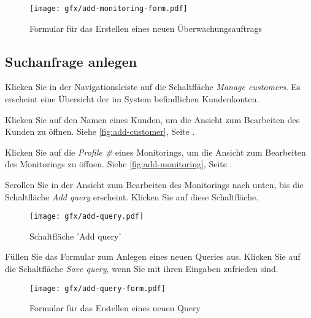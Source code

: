 \begin{figure}[H]
  \texttt{[image: gfx/add-monitoring-form.pdf]}
  \caption{Formular für das Erstellen eines neuen Überwachungsauftrags}
  \label{fig:add-monitoring-form}
\end{figure}

\subsection{Suchanfrage anlegen}

Klicken Sie in der Navigationsleiste auf die Schaltfläche \textit{Manage
customers}. Es erscheint eine Übersicht der im System befindlichen Kundenkonten.

Klicken Sie auf den Namen eines Kunden, um die Ansicht zum Bearbeiten des Kunden
zu öffnen. Siehe \autoref{fig:add-customer}, Seite \pageref{fig:add-customer}.

Klicken Sie auf die \textit{Profile \#} eines Monitorings, um die Ansicht zum
Bearbeiten des Monitorings zu öffnen. Siehe \autoref{fig:add-monitoring}, Seite
\pageref{fig:add-monitoring}.

Scrollen Sie in der Ansicht zum Bearbeiten des Monitorings nach unten, bis die
Schaltfläche \textit{Add query} erscheint. Klicken Sie auf diese Schaltfläche.

\begin{figure}[H]
  \texttt{[image: gfx/add-query.pdf]}
  \caption{Schaltfläche 'Add query'}
  \label{fig:add-query}
\end{figure}

Füllen Sie das Formular zum Anlegen eines neuen Queries aus.
Klicken Sie auf die Schaltfläche \textit{Save query}, wenn Sie mit ihren
Eingaben zufrieden sind.

\begin{figure}[H]
  \texttt{[image: gfx/add-query-form.pdf]}
  \caption{Formular für das Erstellen eines neuen Query}
  \label{fig:add-query-form}
\end{figure}
